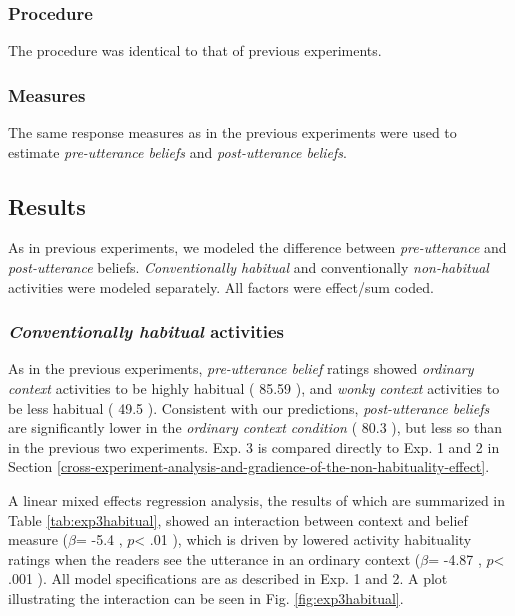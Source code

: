 \documentclass{sp}\usepackage[]{graphicx}\usepackage[]{color}
\begin{document}
\subsubsection{Procedure}

The procedure was identical to that of previous experiments. 

\subsubsection{Measures}

The same response measures as in the previous experiments were used to estimate \textit{pre-utterance beliefs} and \textit{post-utterance beliefs}. 

\subsection{Results}

As in previous experiments, we modeled the difference between \textit{pre-utterance} and \textit{post-utterance} beliefs. \textit{Conventionally habitual} and conventionally \textit{non-habitual} activities were modeled separately. All factors were effect/sum coded. 

\subsubsection{\textit{Conventionally habitual} activities}

As in the previous experiments, \textit{pre-utterance belief} ratings showed \textit{ordinary context} activities to be highly habitual (%
85.59
), and \textit{wonky context} activities to be less habitual (%
49.5
). Consistent with our predictions, \textit{post-utterance beliefs} are significantly lower in the \textit{ordinary context condition} (%
80.3
), but less so than in the previous two experiments. Exp. 3 is compared directly to Exp. 1 and 2 in Section \ref{cross-experiment-analysis-and-gradience-of-the-non-habituality-effect}.

A linear mixed effects regression analysis, the results of which are summarized in Table \ref{tab:exp3habitual}, showed an interaction between context and belief measure ($\beta$=%
-5.4
, $p$<%
.01
), which is driven by lowered activity habituality ratings when the readers see the utterance in an ordinary context ($\beta$=%
-4.87
, $p$<%
.001
). All model specifications are as described in Exp. 1 and 2.  A plot illustrating the interaction can be seen in Fig. \ref{fig:exp3habitual}.
\end{document}

